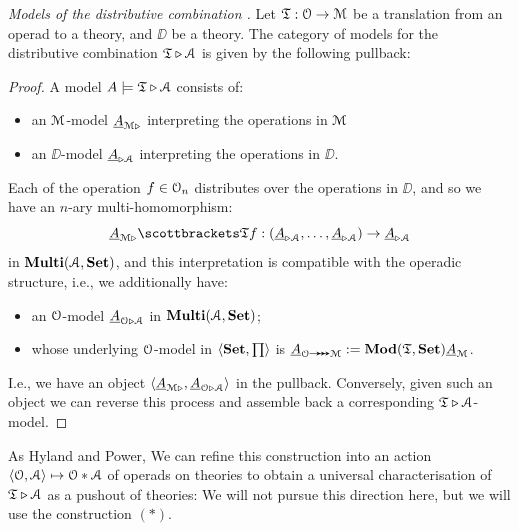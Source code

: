 \begin{proposition}\emph{Models of the distributive combination \citep{hyland-power-discrete-lawvere-theories-journal}.}
  Let $\mathfrak T : \mathcal O \to \mathcal M$ be a translation from an operad to a
  theory, and $\DD$ be a theory.  The category of models for the
  distributive combination $\mathfrak T \mathbin\triangleright \mathcal A$ is given by the
  following pullback:
\end{proposition}
\begin{proof}
  A model $A \models \mathfrak T\mathbin\triangleright\mathcal A$ consists of:
  \begin{itemize}
  \item an $\mathcal M$-model $\underline{A}_{\mathcal M\mathbin\triangleright}$ interpreting the
    operations in $\mathcal M$
  \item an $\DD$-model $\underline{A}_{\mathbin\triangleright\mathcal A}$ interpreting the
    operations in $\DD$.
  \end{itemize}
  Each of the operation $f \in \mathcal O_n$ distributes over the operations
  in $\DD$, and so we have an $n$-ary multi-homomorphism:
  \[
  \carrier A_{\MM\dist}\sem{\Trans f} :
  (\carrier A_{\dist\DD}, \ldots, \carrier A_{\dist\DD}) \to \carrier A_{\dist\DD}
  \]
  in $\mathbf{Multi}(\mathcal A, {\mathbf{ Set}})$, and this interpretation is compatible with
  the operadic structure, i.e., we additionally have:
  \begin{itemize}
  \item an $\mathcal O$-model $\underline{A}_{\mathcal O\mathbin\triangleright\mathcal A}$ in $\mathbf{Multi}(\mathcal A, {\mathbf{ Set}})$;
  \item whose underlying $\mathcal O$-model in $\left<{{\mathbf{ Set}}}, {\prod}\right>$ is $\carrier
    A_{\OO\surtrans \MM} := \Mod(\Trans, \Set)\carrier A_{\MM}$.
  \end{itemize}
  I.e., we have an object $\left<{\underline{A}_{\mathcal M\mathbin\triangleright}}, {\underline{A}_{\mathcal O\mathbin\triangleright\mathcal A}}\right>$ in the pullback. Conversely, given such an
  object we can reverse this process and assemble back a corresponding
  $\mathfrak T\mathbin\triangleright\mathcal A$-model.
\end{proof}
As Hyland and Power, We can refine this construction into an action
$\left<{\mathcal O}, {\mathcal A}\right> \mapsto \mathcal O *\mathcal A$ of operads on theories to obtain a
universal characterisation of $\mathfrak T\mathbin\triangleright\mathcal A$ as a pushout of
theories:
We will not pursue this direction here, but we will use the
construction $(*)$.
